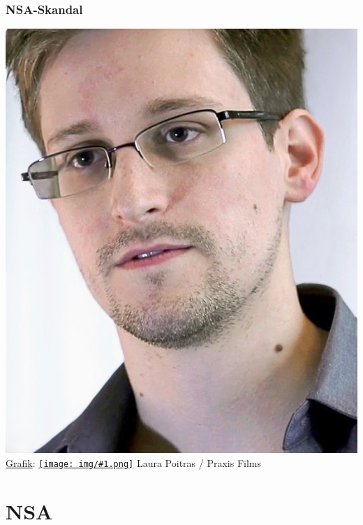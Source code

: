 \documentclass[12pt]{beamer}
\newcommand{\cc}[1]{\texttt{[image: img/\#1.png]}\hspace{1mm}}
\begin{document}
\begin{frame}
    \frametitle{NSA-Skandal}
    \includegraphics[height=0.7\textheight]{img/snowden.jpg}
    \\{\small \href{https://commons.wikimedia.org/wiki/File:Edward_Snowden.jpg\#mediaviewer/File:Edward_Snowden-2.jpg}{Grafik}: \href{https://creativecommons.org/licenses/by/3.0/}{\cc{by}} Laura Poitras / Praxis Films}
\end{frame}

\section{NSA}
\subsection{}
\end{document}
